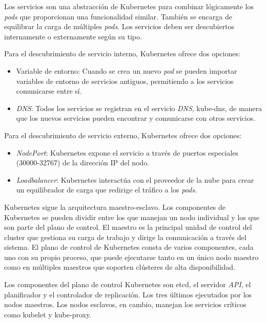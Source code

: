 Los servicios son una abstracción de Kubernetes para combinar lógicamente los \textit{pods} que proporcionan una funcionalidad similar. También se encarga de equilibrar la carga de múltiples \textit{pods}. Los servicios deben ser descubiertos internamente o externamente según su tipo.

Para el descubrimiento de servicio interno, Kubernetes ofrece dos opciones:
\begin{itemize}
\item Variable de entorno: Cuando se crea un nuevo \textit{pod} se pueden importar variables de entorno de servicios antiguos, permitiendo a los servicios comunicarse entre sí.
\item \textit{DNS}: Todos los servicios se registran en el servicio \textit{DNS}, kube-dns, de manera que los nuevos servicios pueden encontrar y comunicarse con otros servicios.
\end{itemize}

Para el descubrimiento de servicio externo, Kubernetes ofrece dos opciones:
\begin{itemize}
\item \textit{NodePort}: Kubernetes expone el servicio a través de puertos especiales (30000-32767) de la dirección IP del nodo.
\item \textit{Loadbalancer}: Kubernetes interactúa con el proveedor de la nube para crear un equilibrador de carga que redirige el tráfico a los \textit{pods}.
\end{itemize}

Kubernetes sigue la arquitectura maestro-esclavo. Los componentes de Kubernetes se pueden dividir entre los que manejan un nodo individual y los que son parte del plano de control. El maestro es la principal unidad de control del cluster que gestiona su carga de trabajo y dirige la comunicación a través del sistema. El plano de control de Kubernetes consta de varios componentes, cada uno con su propio proceso, que puede ejecutarse tanto en un único nodo maestro como en múltiples maestros que soporten clústeres de alta disponibilidad.

Los componentes del plano de control Kubernetes son etcd, el servidor \textit{API}, el planificador y el controlador de replicación. Los tres últimos ejecutados por los nodos maestros. Los nodos esclavos, en cambio, manejan los servicios críticos como kubelet y kube-proxy.

